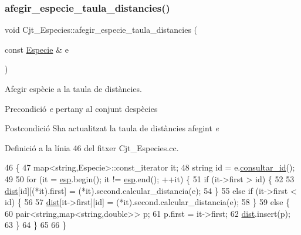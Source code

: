 \subsubsection{\texorpdfstring{afegir\+\_\+especie\+\_\+taula\+\_\+distancies()}{afegir\_especie\_taula\_distancies()}}
{\footnotesize\ttfamily void Cjt\+\_\+\+Especies\+::afegir\+\_\+especie\+\_\+taula\+\_\+distancies (\begin{DoxyParamCaption}\item[{const \hyperlink{class_especie}{Especie} \&}]{e }\end{DoxyParamCaption})\hspace{0.3cm}{\ttfamily [private]}}



Afegir espècie a la taula de distàncies. 

\begin{DoxyPrecond}{Precondició}
{\itshape e} pertany al conjunt d\textquotesingle{}espècies 
\end{DoxyPrecond}
\begin{DoxyPostcond}{Postcondició}
S\textquotesingle{}ha actualitzat la taula de distàncies afegint {\itshape e} 
\end{DoxyPostcond}


Definició a la línia 46 del fitxer Cjt\+\_\+\+Especies.\+cc.


\begin{DoxyCode}
46                                                                    \{
47     map<string,Especie>::const\_iterator it;
48     \textcolor{keywordtype}{string} \textcolor{keywordtype}{id} = e.\hyperlink{class_especie_a1652f05cd2ff7dc71123bf538ecc4476}{consultar\_id}();
49     
50     \textcolor{keywordflow}{for} (it = \hyperlink{class_cjt___especies_aa232ab8543b78ea6d8ecaa1e5f9ccef5}{esp}.begin(); it != \hyperlink{class_cjt___especies_aa232ab8543b78ea6d8ecaa1e5f9ccef5}{esp}.end(); ++it) \{
51         \textcolor{keywordflow}{if} (it->first > \textcolor{keywordtype}{id}) \{
52             
53             \hyperlink{class_cjt___especies_aaf5d15b706e8b0c5b910283d60ef58a6}{dist}[id][(*it).first] = (*it).second.calcular\_distancia(e);
54         \}
55         \textcolor{keywordflow}{else} \textcolor{keywordflow}{if} (it->first < \textcolor{keywordtype}{id}) \{
56             
57             \hyperlink{class_cjt___especies_aaf5d15b706e8b0c5b910283d60ef58a6}{dist}[it->first][id] = (*it).second.calcular\_distancia(e); 
58         \}
59         \textcolor{keywordflow}{else} \{
60             pair<string,map<string,double>> p;
61             p.first = it->first;
62             \hyperlink{class_cjt___especies_aaf5d15b706e8b0c5b910283d60ef58a6}{dist}.insert(p);
63         \}
64     \}        
65     
66 \}
\end{DoxyCode}
\mbox{\label{class_cjt___especies_aa30fcd79ec745178533800095f0e9e22}} 

